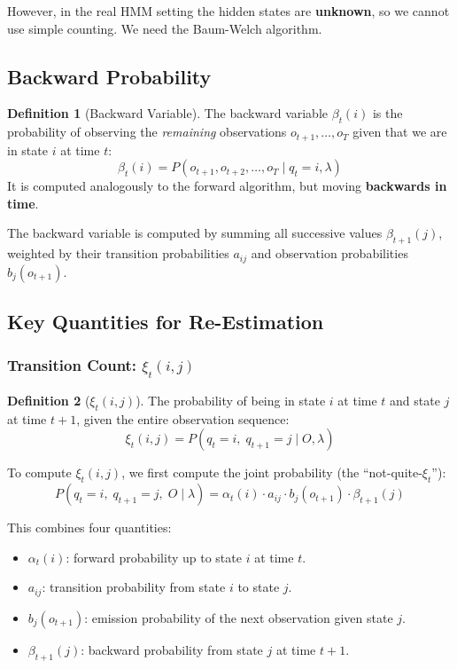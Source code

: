 \documentclass[11pt,a4paper]{article}
\theoremstyle{definition}
\newtheorem{definition}{Definition}[section]
\theoremstyle{plain}
\theoremstyle{remark}
\begin{document}
However, in the real HMM setting the hidden states are \textbf{unknown}, so we cannot use simple counting. We need the Baum-Welch algorithm.

\subsection{Backward Probability}

\begin{definition}[Backward Variable]
The backward variable $\beta_t(i)$ is the probability of observing the \emph{remaining} observations $o_{t+1}, \dots, o_T$ given that we are in state $i$ at time $t$:
\[
\beta_t(i) = P(o_{t+1}, o_{t+2}, \dots, o_T \mid q_t = i, \lambda)
\]
It is computed analogously to the forward algorithm, but moving \textbf{backwards in time}.
\end{definition}

The backward variable is computed by summing all successive values $\beta_{t+1}(j)$, weighted by their transition probabilities $a_{ij}$ and observation probabilities $b_j(o_{t+1})$.

\subsection{Key Quantities for Re-Estimation}

\subsubsection{Transition Count: $\xi_t(i,j)$}

\begin{definition}[$\xi_t(i,j)$]
The probability of being in state $i$ at time $t$ and state $j$ at time $t+1$, given the entire observation sequence:
\[
\xi_t(i, j) = P(q_t = i, \; q_{t+1} = j \mid O, \lambda)
\]
\end{definition}

To compute $\xi_t(i,j)$, we first compute the joint probability (the ``not-quite-$\xi_t$''):
\[
P(q_t = i, \; q_{t+1} = j, \; O \mid \lambda) = \alpha_t(i) \cdot a_{ij} \cdot b_j(o_{t+1}) \cdot \beta_{t+1}(j)
\]

This combines four quantities:
\begin{itemize}
    \item $\alpha_t(i)$: forward probability up to state $i$ at time $t$.
    \item $a_{ij}$: transition probability from state $i$ to state $j$.
    \item $b_j(o_{t+1})$: emission probability of the next observation given state $j$.
    \item $\beta_{t+1}(j)$: backward probability from state $j$ at time $t+1$.
\end{itemize}
\end{document}
